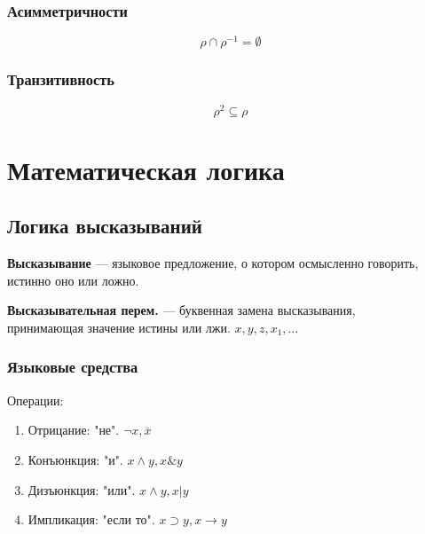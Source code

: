 \documentclass{article}
\begin{document}
\subsubsection{Асимметричности}
\[ \rho \cap \rho^{-1} = \emptyset \]

\subsubsection{Транзитивность}
\[ \rho^2 \subseteq \rho \]

\section{Математическая логика}

\subsection{Логика высказываний}

\textbf{Высказывание} --- языковое предложение, о котором осмысленно говорить, истинно оно или ложно.

\textbf{Высказывательная перем.} --- буквенная замена высказывания, \\
принимающая значение истины или лжи. $x, y, z, x_1, \dots$

\subsubsection{Языковые средства}

Операции:

\begin{enumerate}
	\item Отрицание: "не". $\lnot x, \overline{x}$
	\item Конъюнкция: "и". $x \land y, x \& y$
	\item Дизъюнкция: "или". $x \land y, x | y$
	\item Импликация: "если то". $x \supset y, x \to y$
\end{enumerate}
\end{document}
